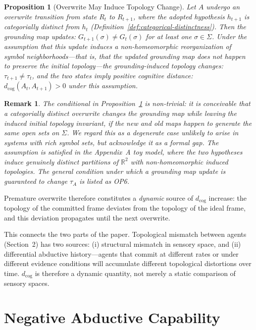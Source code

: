 \documentclass[12pt]{article}
\newtheorem{proposition}{Proposition}
\newtheorem{remark}{Remark}
\begin{document}
\begin{proposition}[Overwrite May Induce Topology Change]
\label{prop:overwrite-tau}
Let $A$ undergo an overwrite transition from state $R_t$ to $R_{t+1}$,
where the adopted hypothesis $h_{t+1}$ is categorially distinct from
$h_t$ (Definition~\ref{def:categorical-distinctness}).
Then the grounding map updates: $G_{t+1}(\sigma) \neq G_t(\sigma)$ for
at least one $\sigma \in \Sigma$.
Under the assumption that this update induces a non-homeomorphic
reorganization of symbol neighborhoods---that is, that the updated
grounding map does not happen to preserve the initial topology---the
grounding-induced topology changes: $\tau_{t+1} \neq \tau_t$,
and the two states imply positive cognitive distance:
$d_\mathrm{cog}(A_t, A_{t+1}) > 0$ under this assumption.
\end{proposition}

\begin{remark}
The conditional in Proposition~\ref{prop:overwrite-tau} is non-trivial:
it is conceivable that a categorially distinct overwrite changes the
grounding map while leaving the induced initial topology invariant, if
the new and old maps happen to generate the same open sets on $\Sigma$.
We regard this as a degenerate case unlikely to arise in systems with
rich symbol sets, but acknowledge it as a formal gap.
The assumption is satisfied in the Appendix~A toy model, where the
two hypotheses induce genuinely distinct partitions of $\mathbb{R}^2$
with non-homeomorphic induced topologies.
The general condition under which a grounding map update is guaranteed
to change $\tau_A$ is listed as OP6.
\end{remark}

Premature overwrite therefore constitutes a \emph{dynamic} source of
$d_\mathrm{cog}$ increase: the topology of the committed frame deviates
from the topology of the ideal frame, and this deviation propagates
until the next overwrite.

This connects the two parts of the paper.
Topological mismatch between agents (Section~2) has two sources:
(i) structural mismatch in sensory space, and
(ii) differential abductive history---agents that commit at different
rates or under different evidence conditions will accumulate different
topological distortions over time.
$d_\mathrm{cog}$ is therefore a dynamic quantity, not merely a static
comparison of sensory spaces.

\section{Negative Abductive Capability}
\end{document}
